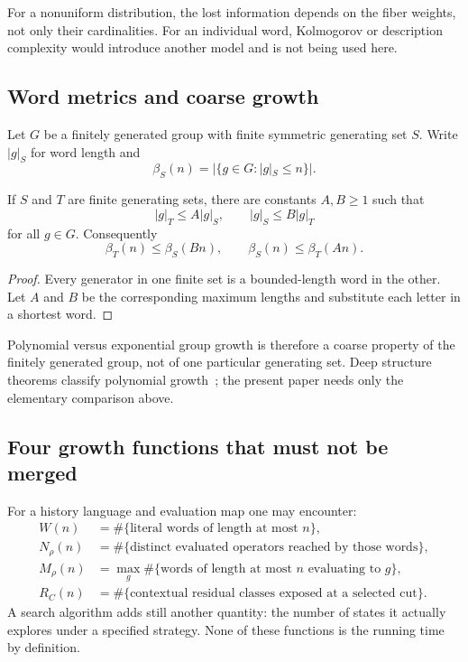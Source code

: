 For a nonuniform distribution, the lost information depends on the fiber
weights, not only their cardinalities.  For an individual word, Kolmogorov or
description complexity would introduce another model and is not being used
here.

\subsection{Word metrics and coarse growth}

Let $G$ be a finitely generated group with finite symmetric generating set
$S$.  Write $|g|_S$ for word length and
\[
  \beta_S(n)=|\{g\in G:|g|_S\le n\}|.
\]

\begin{proposition}
\label{prop:word-metric-comparison}
If $S$ and $T$ are finite generating sets, there are constants $A,B\ge1$ such
that
\[
  |g|_T\le A|g|_S,
  \qquad
  |g|_S\le B|g|_T
\]
for all $g\in G$.  Consequently
\[
  \beta_T(n)\le\beta_S(Bn),
  \qquad
  \beta_S(n)\le\beta_T(An).
\]
\end{proposition}

\begin{proof}
Every generator in one finite set is a bounded-length word in the other.  Let
$A$ and $B$ be the corresponding maximum lengths and substitute each letter in
a shortest word.
\end{proof}

Polynomial versus exponential group growth is therefore a coarse property of
the finitely generated group, not of one particular generating set.  Deep
structure theorems classify polynomial growth~\cite{Gromov1981}; the present
paper needs only the elementary comparison above.

\subsection{Four growth functions that must not be merged}

For a history language and evaluation map one may encounter:
\begin{align*}
  W(n)&=\#\{\text{literal words of length at most }n\},\\
  N_\rho(n)&=\#\{\text{distinct evaluated operators reached by those words}\},\\
  M_\rho(n)&=\max_g\#\{\text{words of length at most }n\text{ evaluating to }g\},\\
  R_C(n)&=\#\{\text{contextual residual classes exposed at a selected cut}\}.
\end{align*}
A search algorithm adds still another quantity: the number of states it
actually explores under a specified strategy.  None of these functions is the
running time by definition.

